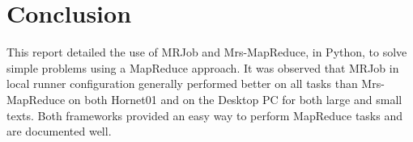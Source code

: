 \documentclass[10pt, twocolumn]{article}
\begin{document}
\section{Conclusion}
%
This report detailed the use of MRJob and Mrs-MapReduce, in Python, to solve simple problems using a MapReduce approach. It was observed that MRJob in local runner configuration generally performed better on all tasks than Mrs-MapReduce on both Hornet01 and on the Desktop PC for both large and small texts. Both frameworks provided an easy way to perform MapReduce tasks and are documented well.
%


\cleardoublepage
\onecolumn
\appendix
\end{document}
